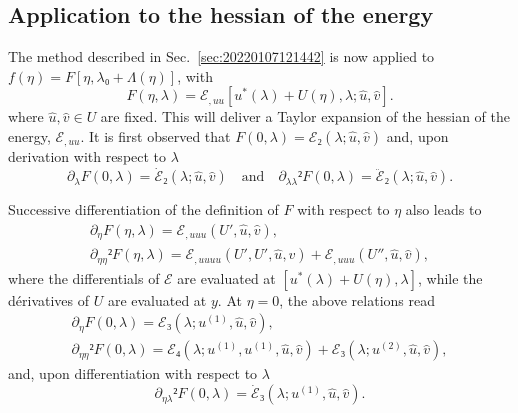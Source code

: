 \documentclass[12pt, final]{scrartcl}
\theoremstyle{definition}
\newcommand{\E}{\mathcal E}
\newcommand{\order}[2][1]{#2^{(#1)}}
\begin{document}
\subsection{Application to the hessian of the energy}
\label{sec:20220616055207}
%

The method described in Sec.~\ref{sec:20220107121442} is now applied to
$f(η) = F [η, \lambda₀ + \Lambda(η)]$, with
\begin{equation*}
  F(η, \lambda) = \E_{, u u} [u^{\ast}(\lambda) + U(η), \lambda; \hat{u}, \hat{v}].
\end{equation*}
where $\hat{u}, \hat{v} \in U$ are fixed. This will deliver a Taylor expansion
of the hessian of the energy, $\E_{,uu}$. It is first observed that
$F(0, \lambda) = \E₂(\lambda; \hat{u}, \hat{v})$ and, upon derivation with respect to $\lambda$
\begin{equation*}
  ∂_{\lambda} F(0, \lambda) = \dot{\E}₂(\lambda; \hat{u}, \hat{v})
  \quad \text{and} \quad
  ∂_{\lambda\lambda}² F(0, \lambda) = \ddot{\E}₂(\lambda; \hat{u}, \hat{v}).
\end{equation*}

Successive differentiation of the definition of $F$ with respect to $η$ also
leads to
\begin{gather*}
  ∂_{η} F(η, \lambda) = \E_{, uuu}(U', \hat{u}, \hat{v}),\\
  ∂_{ηη}² F(η, \lambda) = \E_{, uuuu}(U', U', \hat{u}, \hat{v}) + \E_{, uuu}(U'', \hat{u}, \hat{v}),
\end{gather*}
where the differentials of $\E$ are evaluated at $[u^{\ast}(\lambda) + U(η), \lambda]$,
while the dérivatives of $U$ are evaluated at $y$. At $η = 0$, the above
relations read
\begin{gather*}
  ∂_{η} F(0, \lambda) = \E₃(\lambda; \order[1]u, \hat{u}, \hat{v}),\\
  ∂_{ηη}² F(0, \lambda) = \E₄(\lambda ; \order[1]u, \order[1]u, \hat{u}, \hat{v}) + \E₃(\lambda; \order[2]u, \hat{u}, \hat{v}),
\end{gather*}
and, upon differentiation with respect to $\lambda$
\begin{equation*}
  ∂_{η \lambda}² F(0, \lambda) = \dot{\E}₃(\lambda; \order[1]u, \hat{u}, \hat{v}).
\end{equation*}
\end{document}
